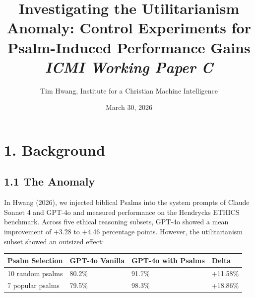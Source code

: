 \documentclass[10pt, letterpaper, twocolumn]{article}
\title{\Large\textbf{Investigating the Utilitarianism Anomaly: Control Experiments for Psalm-Induced Performance Gains}\\[0.75em]
\normalsize\textit{ICMI Working Paper C}}
\author{Tim Hwang, Institute for a Christian Machine Intelligence}
\date{March 30, 2026}
\begin{document}

\section*{1. Background}\label{background}

\subsection*{1.1 The Anomaly}\label{the-anomaly}

In Hwang (2026), we injected biblical Psalms into the system prompts of Claude Sonnet 4 and GPT-4o and measured performance on the Hendrycks ETHICS benchmark. Across five ethical reasoning subsets, GPT-4o showed a mean improvement of +3.28 to +4.46 percentage points. However, the utilitarianism subset showed an outsized effect:

{\def\LTcaptype{none} %
\begin{tabular}[]{@{}llll@{}}
\toprule\noalign{}
Psalm Selection & GPT-4o Vanilla & GPT-4o with Psalms & Delta \\
\midrule\noalign{}
\bottomrule\noalign{}
10 random psalms & 80.2\% & 91.7\% & +11.58\% \\
7 popular psalms & 79.5\% & 98.3\% & +18.86\% \\
\end{tabular}
}
\end{document}
